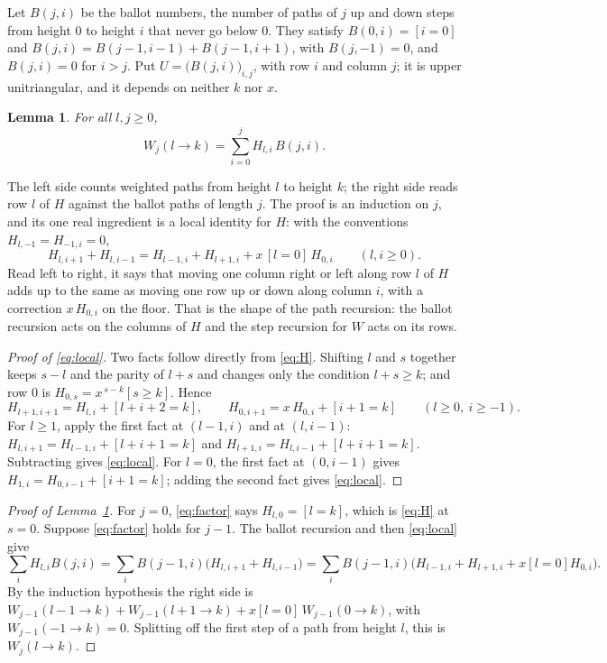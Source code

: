 \documentclass[11pt]{amsart}
\newtheorem{lemma}{Lemma}
\theoremstyle{definition}
\begin{document}
Let $B(j,i)$ be the ballot numbers, the number of paths of $j$ up and down steps from height $0$ to height $i$ that
never go below $0$. They satisfy $B(0,i)=[i=0]$ and $B(j,i)=B(j-1,i-1)+B(j-1,i+1)$, with $B(j,-1)=0$, and
$B(j,i)=0$ for $i>j$. Put $U=\big(B(j,i)\big)_{i,j}$, with row $i$ and column $j$; it is upper unitriangular, and it
depends on neither $k$ nor $x$.

\begin{lemma}\label{lem:factor}
For all $l,j\ge0$,
\begin{equation}\label{eq:factor}
W_j(l\to k)=\sum_{i=0}^{j}H_{l,i}\,B(j,i).
\end{equation}
\end{lemma}

The left side counts weighted paths from height $l$ to height $k$; the right side reads row $l$ of $H$ against the
ballot paths of length $j$. The proof is an induction on $j$, and its one real ingredient is a local identity for $H$:
with the conventions $H_{l,-1}=H_{-1,i}=0$,
\begin{equation}\label{eq:local}
H_{l,i+1}+H_{l,i-1}=H_{l-1,i}+H_{l+1,i}+x\,[l=0]\,H_{0,i}\qquad(l,i\ge0).
\end{equation}
Read left to right, it says that moving one column right or left along row $l$ of $H$ adds up to the same as moving one
row up or down along column $i$, with a correction $x\,H_{0,i}$ on the floor. That is the shape of the path recursion:
the ballot recursion acts on the columns of $H$ and the step recursion for $W$ acts on its rows.

\begin{proof}[Proof of \eqref{eq:local}]
Two facts follow directly from \eqref{eq:H}. Shifting $l$ and $s$ together keeps $s-l$ and the parity of $l+s$ and
changes only the condition $l+s\ge k$; and row $0$ is $H_{0,s}=x^{\,s-k}[s\ge k]$. Hence
\[
H_{l+1,i+1}=H_{l,i}+[l+i+2=k],\qquad H_{0,i+1}=x\,H_{0,i}+[i+1=k]\qquad(l\ge0,\ i\ge-1).
\]
For $l\ge1$, apply the first fact at $(l-1,i)$ and at $(l,i-1)$: $H_{l,i+1}=H_{l-1,i}+[l+i+1=k]$ and
$H_{l+1,i}=H_{l,i-1}+[l+i+1=k]$. Subtracting gives \eqref{eq:local}. For $l=0$, the first fact at $(0,i-1)$ gives
$H_{1,i}=H_{0,i-1}+[i+1=k]$; adding the second fact gives \eqref{eq:local}.
\end{proof}

\begin{proof}[Proof of Lemma~\ref{lem:factor}]
For $j=0$, \eqref{eq:factor} says $H_{l,0}=[l=k]$, which is \eqref{eq:H} at $s=0$. Suppose \eqref{eq:factor} holds for
$j-1$. The ballot recursion and then \eqref{eq:local} give
\[
\sum_i H_{l,i}B(j,i)=\sum_i B(j-1,i)\big(H_{l,i+1}+H_{l,i-1}\big)
=\sum_iB(j-1,i)\big(H_{l-1,i}+H_{l+1,i}+x[l=0]H_{0,i}\big).
\]
By the induction hypothesis the right side is $W_{j-1}(l-1\to k)+W_{j-1}(l+1\to k)+x[l=0]\,W_{j-1}(0\to k)$, with
$W_{j-1}(-1\to k)=0$. Splitting off the first step of a path from height $l$, this is $W_j(l\to k)$.
\end{proof}
\end{document}
